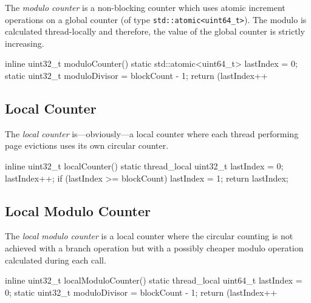     The \emph{modulo counter} is a non-blocking counter which uses atomic increment operations on a global counter (of type \lstinline{std::atomic<uint64_t>}). The modulo is calculated thread-locally and therefore, the value of the global counter is strictly increasing.

\begin{@empty}
    \lstset{
        language = [ISO]C++
    }
\begin{centeredshadowboxlisting}
inline uint32_t moduloCounter() {
    static std::atomic<uint64_t> lastIndex = 0;
    static uint32_t moduloDivisor = blockCount
                                  - 1;
    return (lastIndex++ %
}
\end{centeredshadowboxlisting}
\end{@empty}

\subsection[Local Counter]{Local Counter} \label{subsec:local_counter}

    The \emph{local counter} is---obviously---a local counter where each thread performing page evictions uses its own circular counter.

\begin{@empty}
    \lstset{
        language = [ISO]C++
    }
\begin{centeredshadowboxlisting}
inline uint32_t localCounter() {
    static thread_local uint32_t lastIndex = 0;
    lastIndex++;
    if (lastIndex >= blockCount) {
        lastIndex = 1;
    }
    return lastIndex;
}
\end{centeredshadowboxlisting}
\end{@empty}

\subsection[Local Modulo Counter]{Local Modulo Counter} \label{subsec:local_modulo_counter}

    The \emph{local modulo counter} is a local counter where the circular counting is not achieved with a branch operation but with a possibly cheaper modulo operation calculated during each call.

\begin{@empty}
    \lstset{
        language = [ISO]C++
    }
\begin{centeredshadowboxlisting}
inline uint32_t localModuloCounter() {
    static thread_local uint64_t lastIndex = 0;
    static uint32_t moduloDivisor = blockCount
                                  - 1;
    return (lastIndex++ %
}
\end{centeredshadowboxlisting}
\end{@empty}

